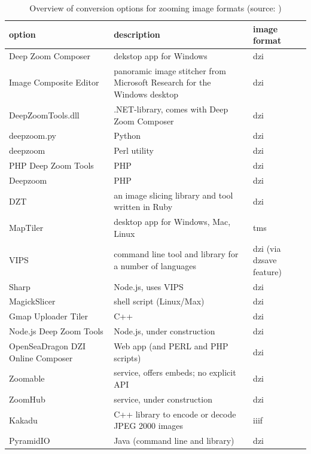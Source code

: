 \begin{table}[H]
	\begin{center}
		\begin{tabular}{| p{3cm} | p{4cm} | p{2cm} |}
			\hline
			\textbf{option} & \textbf{description} & \textbf{image format} \\
			\hline
      		Deep Zoom Composer & dekstop app for Windows & dzi \\ \hline
      		Image Composite Editor & panoramic image stitcher from Microsoft Research for the Windows desktop & dzi \\ \hline
      		DeepZoomTools.dll & .NET-library, comes with Deep Zoom Composer & dzi \\ \hline
      		deepzoom.py & Python & dzi \\ \hline
      		deepzoom & Perl utility & dzi \\ \hline
      		PHP Deep Zoom Tools & PHP & dzi \\ \hline
      		Deepzoom & PHP & dzi \\ \hline
     		 DZT & an image slicing library and tool written in Ruby & dzi \\ \hline
     		MapTiler &  desktop app for Windows, Mac, Linux & tms \\ \hline
      		VIPS & command line tool and library for a number of languages & dzi (via dzsave feature) \\ \hline
     		Sharp & Node.js, uses VIPS & dzi \\ \hline
      		MagickSlicer & shell script (Linux/Max) & dzi \\ \hline
      		Gmap Uploader Tiler & C++ & dzi \\ \hline
      		Node.js Deep Zoom Tools & Node.js, under construction & dzi \\ \hline
      		OpenSeaDragon DZI Online Composer & Web app (and PERL and PHP scripts) & dzi \\ \hline
      		Zoomable & service, offers embeds; no explicit API & dzi \\ \hline
      		ZoomHub & service, under construction & dzi \\ \hline
      		Kakadu & C++ library to encode or decode JPEG 2000 images & iiif \\ \hline
      		PyramidIO & Java (command line and library) & dzi \\ \hline
  		\end{tabular}
  	\caption{Overview of conversion options for zooming image formats (source: \cite{web:openseadragon})}
  	\end{center}
\end{table}


